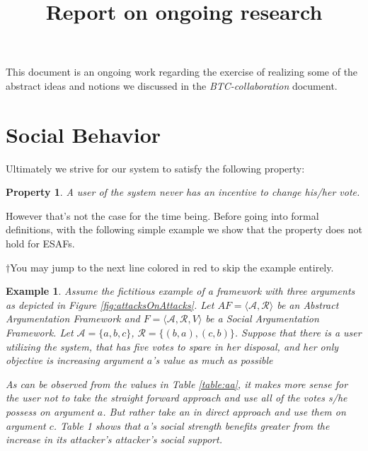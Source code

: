 \documentclass{article}
\date{ }
\newtheorem{property}{Property}
\newtheorem{example}{Example}
\newcommand{\args}{\mathcal{A}} %
\newcommand{\att}{\mathcal{R}}  %
\newcommand{\safid}{F}               %
\newcommand{\oldsaf}{\safid = \oldsafbody} %
\newcommand{\oldsafbody}{\langle \args, \att, V \rangle} %
\newcommand{\afit}{\textit{AF}}
\newcommand{\af}{\afit = \langle \args, \att \rangle}
\begin{document}
\title{Report on ongoing research}

\maketitle

This document is an ongoing work regarding the exercise of realizing some of the abstract ideas and notions we discussed in the \emph{BTC-collaboration} document.





\section{Social Behavior}

Ultimately we strive for our system to satisfy the following property:

\begin{property}
A user of the system never has an incentive to change his/her vote.
\end{property}

However that's not the case for the time being. Before going into formal definitions, with the following simple example we show that the property does not hold for ESAFs.

{\color{red}   $\dagger$You may jump to the next line colored in red to skip the example entirely.}

\begin{example}
Assume the fictitious example of a framework with three arguments as depicted in Figure \ref{fig:attacksOnAttacks}. Let $\af$ be an Abstract Argumentation Framework and $\oldsaf$ be a Social Argumentation Framework. Let  $\args = \{a, b, c\}$, $\att = \{(b,a), (c,b)\}$.
Suppose that there is a user utilizing the system, that has five votes to spare in her disposal, and her only objective is increasing argument $a$'s value as much as possible

As can be observed from the values in Table \ref{table:aa}, it makes more sense for the user not to take the straight forward approach and use all of the votes s/he possess on argument $a$. But rather take an in direct approach and use them on argument $c$. Table 1 shows that $a$'s social strength benefits greater from the increase in its attacker's attacker's social support.



\end{example}
\end{document}
